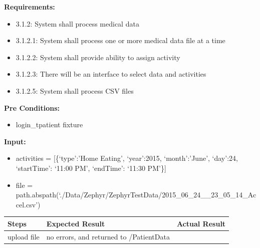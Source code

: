 \documentclass[letterpaper,10pt,english]{sphinxmanual}
\begin{document}
\begin{fulllineitems}
\label{STD/test_upload:test_upload.test_single_file_one_activity}
\textbf{Requirements:}
\begin{itemize}
\item {} 
3.1.2: System shall process medical data

\item {} 
3.1.2.1: System shall process one or more medical data file at a time

\item {} 
3.1.2.2: System shall provide ability to assign activity

\item {} 
3.1.2.3: There will be an interface to select data and activities

\item {} 
3.1.2.5: System shall process CSV files

\end{itemize}

\textbf{Pre Conditions:}
\begin{itemize}
\item {} 
login\_tpatient fixture

\end{itemize}

\textbf{Input:}
\begin{itemize}
\item {} 
activities = {[}\{`type':'Home Eating', `year':2015, `month':'June', `day':24, `startTime': `11:00 PM', `endTime': `11:30 PM'\}{]}

\item {} 
file = path.abspath(`./Data/Zephyr/ZephyrTestData/2015\_06\_24\_\_23\_05\_14\_Accel.csv')

\end{itemize}

\begin{tabulary}{\linewidth}{|L|L|L|}
\hline
\textsf{\relax 
Steps
} & \textsf{\relax 
Expected Result
} & \textsf{\relax 
Actual Result
}\\
\hline
upload file
 & 
no errors, and returned to /PatientData
 & \\
\hline\end{tabulary}


\end{fulllineitems}

\end{document}

